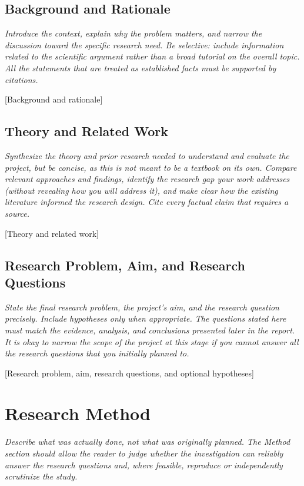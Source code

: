 \documentclass[11pt,a4paper]{article}
\newcommand{\guidance}[1]{%
  {\setstretch{1.0}\fontsize{9}{11}\selectfont\color{guidancetext}\itshape #1\par}%
  \vspace{-6pt}%
}
\newcommand{\placeholder}[1]{#1\par}
\begin{document}
\subsection{Background and Rationale}

\guidance{Introduce the context, explain why the problem matters, and narrow the discussion toward the specific research need. Be selective: include information related to the scientific argument rather than a broad tutorial on the overall topic. All the statements that are treated as established facts must be supported by citations.}

\placeholder{[Background and rationale]}

\subsection{Theory and Related Work}

\guidance{Synthesize the theory and prior research needed to understand and evaluate the project, but be concise, as this is not meant to be a textbook on its own. Compare relevant approaches and findings, identify the research gap your work addresses (without revealing how you will address it), and make clear how the existing literature informed the research design. Cite every factual claim that requires a source.}

\placeholder{[Theory and related work]}

\subsection{Research Problem, Aim, and Research Questions}

\guidance{State the final research problem, the project’s aim, and the research question precisely. Include hypotheses only when appropriate. The questions stated here must match the evidence, analysis, and conclusions presented later in the report. It is okay to narrow the scope of the project at this stage if you cannot answer all the research questions that you initially planned to.}

\placeholder{[Research problem, aim, research questions, and optional hypotheses]}

\section{Research Method}

\guidance{Describe what was actually done, not what was originally planned. The Method section should allow the reader to judge whether the investigation can reliably answer the research questions and, where feasible, reproduce or independently scrutinize the study.}
\end{document}
